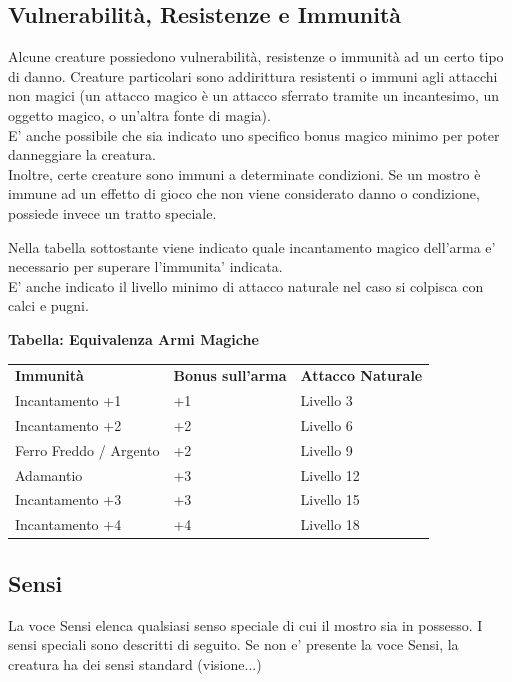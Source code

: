 \begin{multicols}{2}
\subsection{Vulnerabilità, Resistenze e Immunità}

Alcune creature possiedono vulnerabilità, resistenze o immunità ad un certo tipo di danno. Creature particolari sono addirittura resistenti o immuni agli attacchi non magici (un attacco magico è un attacco sferrato tramite un incantesimo, un oggetto magico, o un'altra fonte di magia). \\
E' anche possibile che sia indicato uno specifico bonus magico minimo per poter danneggiare la creatura.\\
Inoltre, certe creature sono immuni a determinate condizioni. Se  un mostro è immune ad un effetto di gioco che non viene considerato danno o condizione, possiede invece un tratto speciale.


Nella tabella sottostante viene indicato quale incantamento magico dell'arma e' necessario per superare l'immunita' indicata.\\
E' anche indicato il livello minimo di attacco naturale nel caso si colpisca con calci e pugni.

\medskip

\textbf{Tabella: Equivalenza Armi Magiche}

\medskip

\begin{tabularx}{0.45\textwidth}{lXX}
	\toprule
	\textbf{Immunità} & \textbf{Bonus sull'arma} & \textbf{Attacco Naturale}\\
	Incantamento +1         & +1              & Livello 3\\
	Incantamento +2         & +2              & Livello 6\\
	Ferro Freddo / Argento  & +2              & Livello 9\\
	Adamantio               & +3              & Livello 12\\
	Incantamento +3         & +3              & Livello 15\\
	Incantamento +4         & +4              & Livello 18\\
\end{tabularx}


\subsection{Sensi}

La voce Sensi elenca qualsiasi senso speciale di cui il mostro sia in possesso. I sensi speciali sono descritti di seguito. Se non e' presente la voce Sensi, la creatura ha dei sensi standard (visione...)


\end{multicols}
